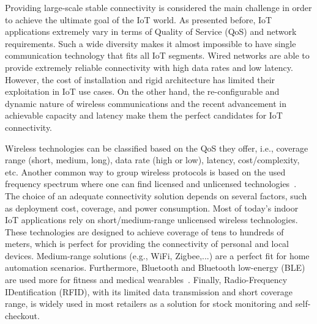 \documentclass[]{IEEEtran}
\begin{document}
Providing large-scale stable connectivity is considered the main challenge in order to achieve the ultimate goal of the IoT world.
As presented before, IoT applications extremely vary in terms of Quality of Service (QoS) and network requirements.
Such a wide diversity makes it almost impossible to have single communication technology that fits all IoT segments\cite{vaezi_cellular_2022_2}.
Wired networks are able to provide extremely reliable connectivity with high data rates and low latency.
However, the cost of installation and rigid architecture has limited their exploitation in IoT use cases.
On the other hand, the re-configurable and dynamic nature of wireless communications and the recent advancement in achievable capacity and latency make them the perfect candidates for IoT connectivity.

Wireless technologies can be classified based on the QoS they offer, i.e., coverage range (short, medium, long), data rate (high or low), latency, cost/complexity, etc.
Another common way to group wireless protocols is based on the used frequency spectrum where one can find licensed and unlicensed technologies~\cite{xu_narrowband_2018_3}.
The choice of an adequate connectivity solution depends on several factors, such as deployment cost, coverage, and power consumption.
Most of today's indoor IoT applications rely on short/medium-range unlicensed wireless technologies.
These technologies are designed to achieve coverage of tens to hundreds of meters, which is perfect for providing the connectivity of personal and local devices.
Medium-range solutions (e.g., WiFi, Zigbee,...) are a perfect fit for home automation scenarios.
Furthermore, Bluetooth and Bluetooth low-energy (BLE) are used more for fitness and medical wearables~\cite{vaezi_cellular_2022_2}.
Finally, Radio-Frequency IDentification (RFID), with its limited data transmission and short coverage range, is widely used in most retailers as a solution for stock monitoring and self-checkout\cite{beyene_nb-iot_2017}.
\end{document}
